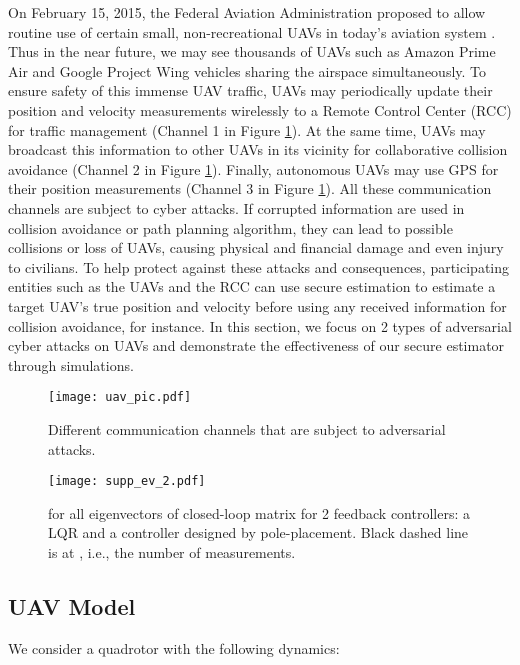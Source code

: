 \documentclass[journal]{IEEEtran}
\begin{document}
On February 15, 2015, the Federal Aviation Administration proposed to allow routine use of certain small, non-recreational UAVs in today's aviation system \cite{faa}. Thus in the near future, we may see thousands of UAVs such as Amazon Prime Air \cite{Amazon} and Google Project Wing vehicles \cite{Google} sharing the airspace simultaneously. To ensure safety of this immense UAV traffic, UAVs may periodically update their position and velocity measurements wirelessly to a Remote Control Center (RCC) for traffic management (Channel 1 in Figure \ref{fig:ex_uav_pic}). At the same time, UAVs may broadcast this information to other UAVs in its vicinity for collaborative collision avoidance (Channel 2 in Figure \ref{fig:ex_uav_pic}). Finally, autonomous UAVs may use GPS for their position measurements (Channel 3 in Figure \ref{fig:ex_uav_pic}). 
All these communication channels are subject to cyber attacks. 
If corrupted information are used in collision avoidance or path planning algorithm, they can lead to possible collisions or loss of UAVs, causing physical and financial damage and even injury to civilians.
To help protect against these attacks and consequences, participating entities such as the UAVs and the RCC can use secure estimation to estimate a target UAV's true position and velocity before using any received information for collision avoidance, for instance.
In this section, we focus on 2 types of adversarial cyber attacks on UAVs and demonstrate the effectiveness of our secure estimator through simulations.

\begin{figure}
\center
\texttt{[image: uav\_pic.pdf]}
\caption{Different communication channels that are subject to adversarial attacks.}
\label{fig:ex_uav_pic}
\end{figure}



\begin{figure}[b]
\center
\texttt{[image: supp\_ev\_2.pdf]}
\caption{ for all eigenvectors  of closed-loop matrix  for 2 feedback controllers: a LQR and a controller designed by pole-placement. Black dashed line is at , i.e., the number of measurements.}
\label{fig:ex_pole}
\end{figure}


\subsection{UAV Model}
We consider a quadrotor with the following dynamics:
\end{document}
